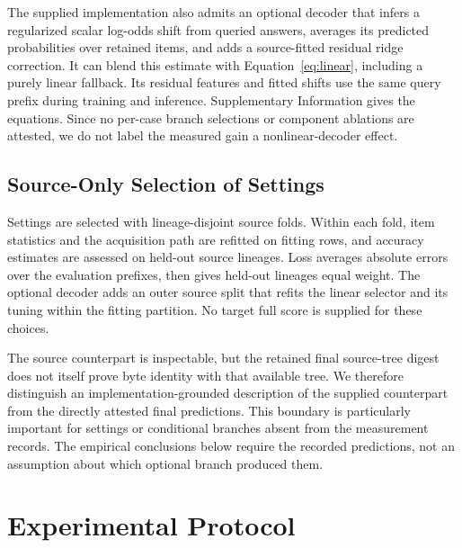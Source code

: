 \documentclass{article}
\begin{document}
The supplied implementation also admits an optional decoder that infers a regularized scalar log-odds shift from queried answers, averages its predicted probabilities over retained items, and adds a source-fitted residual ridge correction. It can blend this estimate with Equation~\ref{eq:linear}, including a purely linear fallback. Its residual features and fitted shifts use the same query prefix during training and inference. Supplementary Information gives the equations. Since no per-case branch selections or component ablations are attested, we do not label the measured gain a nonlinear-decoder effect.

\subsection{Source-Only Selection of Settings}
Settings are selected with lineage-disjoint source folds. Within each fold, item statistics and the acquisition path are refitted on fitting rows, and accuracy estimates are assessed on held-out source lineages. Loss averages absolute errors over the evaluation prefixes, then gives held-out lineages equal weight. The optional decoder adds an outer source split that refits the linear selector and its tuning within the fitting partition. No target full score is supplied for these choices.

The source counterpart is inspectable, but the retained final source-tree digest does not itself prove byte identity with that available tree. We therefore distinguish an implementation-grounded description of the supplied counterpart from the directly attested final predictions. This boundary is particularly important for settings or conditional branches absent from the measurement records. The empirical conclusions below require the recorded predictions, not an assumption about which optional branch produced them.

\section{Experimental Protocol}
\end{document}

